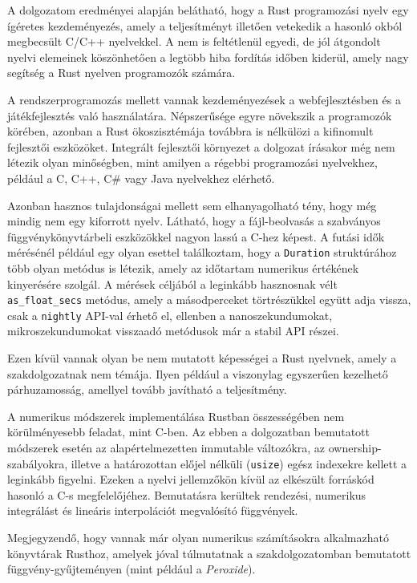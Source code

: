 
A dolgozatom eredményei alapján belátható, hogy a Rust programozási nyelv egy ígéretes kezdeményezés, amely a teljesítményt illetően vetekedik a hasonló okból megbecsült C/C++ nyelvekkel. A nem is feltétlenül egyedi, de jól átgondolt nyelvi elemeinek köszönhetően a legtöbb hiba fordítás időben kiderül, amely nagy segítség a Rust nyelven programozók számára.

A rendszerprogramozás mellett vannak kezdeményezések a webfejlesztésben és a játékfejlesztés való használatára. Népszerűsége egyre növekszik a programozók körében, azonban a Rust ökoszisztémája továbbra is nélkülözi a kifinomult fejlesztői eszközöket. Integrált fejlesztői környezet a dolgozat írásakor még nem létezik olyan minőségben, mint amilyen a régebbi programozási nyelvekhez, például a C, C++, C\# vagy Java nyelvekhez elérhető.

Azonban hasznos tulajdonságai mellett sem elhanyagolható tény, hogy még mindig nem egy kiforrott nyelv. Látható, hogy a fájl-beolvasás a szabványos függvénykönyvtárbeli eszközökkel nagyon lassú a C-hez képest. A futási idők mérésénél például egy olyan esettel találkoztam, hogy a \lstinline{Duration} struktúrához több olyan metódus is létezik, amely az időtartam numerikus értékének kinyerésére szolgál. A mérések céljából a leginkább hasznosnak vélt \lstinline{as_float_secs} metódus, amely a másodperceket törtrészükkel együtt adja vissza, csak a \lstinline{nightly} API-val érhető el, ellenben a nanoszekundumokat, mikroszekundumokat visszaadó metódusok már a stabil API részei.

Ezen kívül vannak olyan be nem mutatott képességei a Rust nyelvnek, amely a szakdolgozatnak nem témája. Ilyen például a viszonylag egyszerűen kezelhető párhuzamosság, amellyel tovább javítható a teljesítmény.

A numerikus módszerek implementálása Rustban összességében nem körülményesebb feladat, mint C-ben. Az ebben a dolgozatban bemutatott módszerek esetén az alapértelmezetten immutable változókra, az ownership-szabályokra, illetve a határozottan előjel nélküli (\lstinline{usize}) egész indexekre kellett a leginkább figyelni. Ezeken a nyelvi jellemzőkön kívül az elkészült forráskód hasonló a C-s megfelelőjéhez. Bemutatásra kerültek rendezési, numerikus integrálást és lineáris interpolációt megvalósító függvények.

Megjegyzendő, hogy vannak már olyan numerikus számításokra alkalmazható könyvtárak Rusthoz, amelyek jóval túlmutatnak a szakdolgozatomban bemutatott függvény-gyűjteményen (mint például a \textit{Peroxide}).

